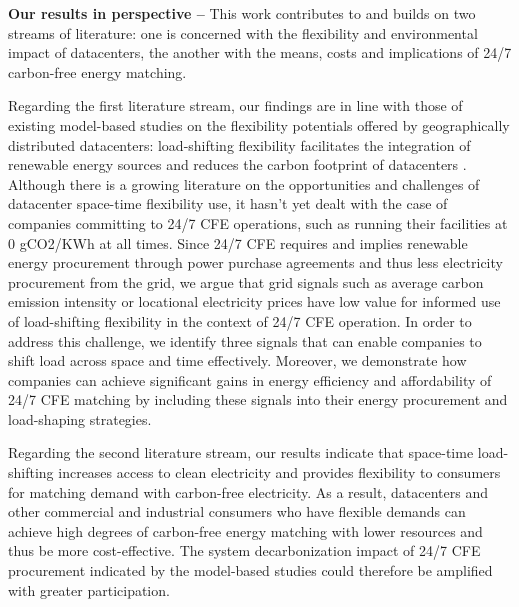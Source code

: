 %

\textbf{Our results in perspective --} This work contributes to and builds on two streams of literature: one is concerned with the flexibility and environmental impact of datacenters, the another with the means, costs and implications of 24/7 carbon-free energy matching.

Regarding the first literature stream, our findings are in line with those of existing model-based studies on the flexibility potentials offered by geographically distributed datacenters: load-shifting flexibility facilitates the integration of renewable energy sources and reduces the carbon footprint of datacenters \cite{zhengMitigatingCurtailmentCarbon2020, mahmudDistributedFrameworkCarbon2016, wangGreenawareVirtualMachine2015, kimDataCentersDispatchable2017, liuGeographicalLoadBalancing2011, kellyBalancingPowerSystems2016, lindbergEnvironmentalPotentialHyperScale2021}.
Although there is a growing literature on the opportunities and challenges of datacenter space-time flexibility use, it hasn't yet dealt with the case of companies committing to 24/7 CFE operations, such as running their facilities at 0 gCO2/KWh at all times.
Since 24/7 CFE requires and implies renewable energy procurement through power purchase agreements and thus less electricity procurement from the grid, we argue that grid signals such as average carbon emission intensity or locational electricity prices have low value for informed use of load-shifting flexibility in the context of 24/7 CFE operation.
In order to address this challenge, we identify three signals that can enable companies to shift load across space and time effectively.
Moreover, we demonstrate how companies can achieve significant gains in energy efficiency and affordability of 24/7 CFE matching by including these signals into their energy procurement and load-shaping strategies.

Regarding the second literature stream, our results indicate that space-time load-shifting increases access to clean electricity and provides flexibility to consumers for matching demand with carbon-free electricity.
As a result, datacenters and other commercial and industrial consumers who have flexible demands can achieve high degrees of carbon-free energy matching with lower resources and thus be more cost-effective.
The system decarbonization impact of 24/7 CFE procurement indicated by the model-based studies \cite{xu-247CFE-report,riepin-zenodo-systemlevel247} could therefore be amplified with greater participation.

